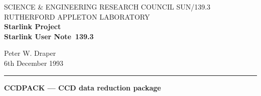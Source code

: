 \pagestyle{myheadings}

\newcommand{\stardoccategory}  {Starlink User Note}
\newcommand{\stardocinitials}  {SUN}
\newcommand{\stardocnumber}    {139.3}
\newcommand{\stardocauthors}   {Peter W. Draper}
\newcommand{\stardocdate}      {6th December 1993}
\newcommand{\stardoctitle}     {CCDPACK --- CCD data reduction package}

\newcommand{\stardocname}{\stardocinitials /\stardocnumber}
\renewcommand{\_}{{\tt\char'137}}     %
\markright{\stardocname}
\setlength{\textwidth}{160mm}
\setlength{\textheight}{230mm}
\setlength{\topmargin}{-2mm}
\setlength{\oddsidemargin}{0mm}
\setlength{\evensidemargin}{0mm}
\setlength{\parindent}{0mm}
\setlength{\parskip}{\medskipamount}
\setlength{\unitlength}{1mm}

%
\newcommand{\numcir}[1]
{\mbox{\hspace{4ex}{\normalsize$\bigcirc$}\hspace{-1.9ex}{\small #1}}}
%
\newenvironment{myquote}{\begin{quote}\begin{small}}{\end{small}\end{quote}}
%
\newcommand{\myverb}[1]{{\small \verb+#1+}}
%
\newcommand{\quickdes}[3]{ 
                         \parbox{1.1in}{\bf #1} 
                         \parbox{4.4in}{\raggedright #2 \dotfill}
                         \parbox{0.6in}{\pageref{#3}}
                         \vspace*{0.2in}}


\thispagestyle{empty}
SCIENCE \& ENGINEERING RESEARCH COUNCIL \hfill \stardocname\\
RUTHERFORD APPLETON LABORATORY\\
{\large\bf Starlink Project\\}
{\large\bf \stardoccategory\ \stardocnumber}
\begin{flushright}
\stardocauthors\\
\stardocdate
\end{flushright}
\vspace{-4mm}
\rule{\textwidth}{0.5mm}
\vspace{5mm}
\begin{center}
{\Large\bf \stardoctitle}
\end{center}
\vspace{5mm}

